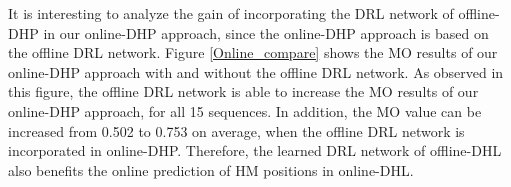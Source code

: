 \documentclass[10pt,journal,compsoc]{IEEEtran}
\begin{document}
It is interesting to analyze the gain of incorporating the DRL network of offline-DHP in our online-DHP approach, since the online-DHP approach is based on the offline DRL network. Figure \ref{Online_compare} shows the MO results of our online-DHP approach with and without the offline DRL network. As observed in this figure, the offline DRL network is able to increase the MO results of our online-DHP approach, for all 15 sequences. In addition, the MO value can be increased from 0.502 to 0.753 on average, when the offline DRL network is incorporated in online-DHP. Therefore, the learned DRL network of offline-DHL also benefits the online prediction of HM positions in online-DHL.

\end{document}
